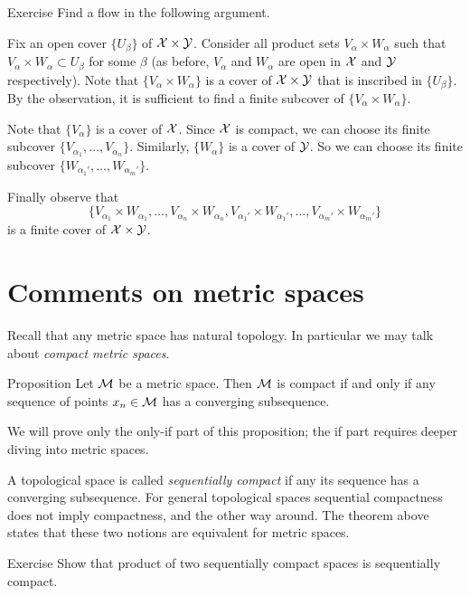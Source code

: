 \begin{thm}{Exercise}
Find a flow in the following argument.
\end{thm}

Fix an open cover $\{U_\beta\}$ of $\mathcal{X}\times\mathcal{Y}$.
Consider all product sets $V_\alpha\times W_\alpha$ such that $V_\alpha\times W_\alpha\subset U_\beta$ for some $\beta$ (as before, $V_\alpha$ and $W_\alpha$ are open in $\mathcal{X}$ and $\mathcal{Y}$ respectively).
Note that $\{V_\alpha\times W_\alpha\}$ is a cover of $\mathcal{X}\times\mathcal{Y}$ that is inscribed in $\{U_\beta\}$.
By the observation, it is sufficient to find a finite subcover of $\{V_\alpha\times W_\alpha\}$.

Note that $\{V_\alpha\}$ is a cover of $\mathcal{X}$.
Since $\mathcal{X}$ is compact, we can choose its finite subcover $\{V_{\alpha_1},\dots,V_{\alpha_n}\}$.
Similarly, $\{W_\alpha\}$ is a cover of $\mathcal{Y}$.
So we can choose its finite subcover $\{W_{\alpha_1'},\dots,W_{\alpha_m'}\}$.

Finally observe that 
\[\{V_{\alpha_1}\times W_{\alpha_1},\dots,V_{\alpha_n}\times W_{\alpha_n},V_{\alpha_1'}\times W_{\alpha_1'},\dots,V_{\alpha_m'}\times W_{\alpha_m'}\}\] is a finite cover of $\mathcal{X}\times\mathcal{Y}$.
\qeds


\section{Comments on metric spaces}

Recall that any metric space has natural topology.
In particular we may talk about \emph{compact metric spaces}.

\begin{thm}{Proposition}
Let $\mathcal{M}$ be a metric space.
Then $\mathcal{M}$ is compact if and only if any sequence of points $x_n\in \mathcal{M}$ has a converging subsequence.
\end{thm}

We will prove only the only-if part of this proposition;
the if part requires deeper diving into metric spaces.

A topological space is called \emph{sequentially compact} if any its sequence has a converging subsequence.
For general topological spaces sequential compactness does not imply compactness, and the other way around.
The theorem above states that these two notions are equivalent for metric spaces.

\begin{thm}{Exercise}
Show that product of two sequentially compact spaces is sequentially compact.
\end{thm}



